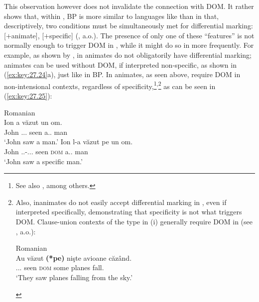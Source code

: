 \documentclass[output=paper]{langsci/langscibook}
\begin{document}
This observation however does not invalidate the connection with DOM\@. It
rather shows that, within , \gls{BP} is
more similar to languages like  than  in that,
descriptively, two conditions must be simultaneously met for differential
marking: [$+$animate], [$+$specific]
(\citealt{Farkas1985,Dobrovie-Sorin1994,IrimiaCyrino2015}, a.o.). The presence
of only one of these \enquote{features} is not normally enough to trigger
DOM in , while it might do so in
 more frequently. For example, as shown by
\citet{IrimiaCyrino2015,IrimiaCyrino2017}, in  animates do not
obligatorily have differential marking; animates can be used without
DOM, if interpreted non-specific, as shown in
(\ref{ex:key:27.24}a), just like  in BP\@. In 
animates, as seen above, require DOM in
non-intensional contexts, regardless of specificity,\footnote{See also
    \citet{Lopez2012,Leonetti2008}, among
    others.}\textsuperscript{,}\footnote{Also, inanimates do not easily accept
    differential marking in , even if interpreted specifically,
    demonstrating that specificity is not what triggers DOM\@. Clause-union
    contexts of the type in (i) generally require DOM in  (see \citealt{Lopez2012}, a.o.):

\begin{exe}
     Romanian\\
        \gll Au văzut \textbf{(*pe)} nişte avioane căzând.\\
            \Aux.\Tpl.\Prs.\Indic{} seen \hphantom{(*}\textsc{dom} some planes fall.\Ger{}\\
        \glt `They saw planes falling from the sky.'
\end{exe}} as can be seen in (\ref{ex:key:27.25}):\newpage

\ea\label{ex:key:27.24} Romanian\\
    \ea
        \gll Ion         a                                 văzut un         om.\\
             John        \Aux.\Tsg{}.\Prs{}.\Indic{}      seen a.\M.\Sg{}    man\\
        \glt `John saw a man.'
    \ex
        \gll Ion       l-a văzut pe un om.\\
        John     \Cl.\Tsg.\M-\Aux.\Tsg{}.\Prs.\Indic{} seen \textsc{dom} a.\M.\Sg{} man\\
        \glt `John saw a specific man.'
    \z
\z
\end{document}
